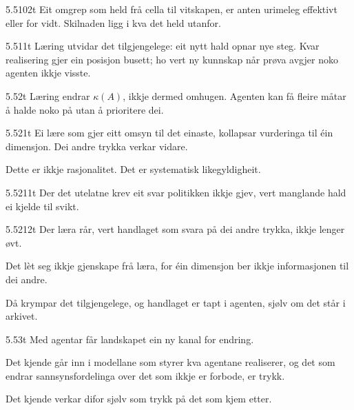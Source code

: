 \begin{formproposition}{5.5102}{t}
Eit omgrep som held frå cella til vitskapen, er anten urimeleg effektivt eller for vidt. Skilnaden ligg i kva det held utanfor.
\end{formproposition}

\begin{formproposition}{5.511}{t}
Læring utvidar det tilgjengelege: eit nytt hald opnar nye steg. Kvar realisering gjer ein posisjon busett; ho vert ny kunnskap når prøva avgjer noko agenten ikkje visste.
\end{formproposition}

\begin{formproposition}{5.52}{t}
Læring endrar \(\kappa(A)\), ikkje dermed omhugen. Agenten kan få fleire måtar å halde noko på utan å prioritere dei.
\end{formproposition}

\begin{formproposition}{5.521}{t}
Ei lære som gjer eitt omsyn til det einaste, kollapsar vurderinga til éin dimensjon. Dei andre trykka verkar vidare.

Dette er ikkje rasjonalitet. Det er systematisk likegyldigheit.
\end{formproposition}

\begin{formproposition}{5.5211}{t}
Der det utelatne krev eit svar politikken ikkje gjev, vert manglande hald ei kjelde til svikt.
\end{formproposition}

\begin{formproposition}{5.5212}{t}
Der læra rår, vert handlaget som svara på dei andre trykka, ikkje lenger øvt.

Det lèt seg ikkje gjenskape frå læra, for éin dimensjon ber ikkje informasjonen til dei andre.

Då krympar det tilgjengelege, og handlaget er tapt i agenten, sjølv om det står i arkivet.
\end{formproposition}

\begin{formproposition}{5.53}{t}
Med agentar får landskapet ein ny kanal for endring.

Det kjende går inn i modellane som styrer kva agentane realiserer, og det som endrar sannsynsfordelinga over det som ikkje er forbode, er trykk.

Det kjende verkar difor sjølv som trykk på det som kjem etter.
\end{formproposition}

